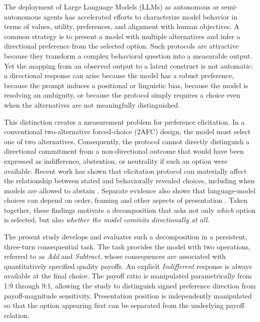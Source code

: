 \documentclass[10pt,journal,compsoc]{IEEEtran}
\begin{document}
The deployment of Large Language Models (LLMs) as autonomous or semi-autonomous agents has accelerated efforts to characterize model behavior in terms of values, utility, preferences, and alignment with human objectives. A common strategy is to present a model with multiple alternatives and infer a directional preference from the selected option. Such protocols are attractive because they transform a complex behavioral question into a measurable output. Yet the mapping from an observed output to a latent construct is not automatic: a directional response can arise because the model has a robust preference, because the prompt induces a positional or linguistic bias, because the model is resolving an ambiguity, or because the protocol simply requires a choice even when the alternatives are not meaningfully distinguished.

This distinction creates a measurement problem for preference elicitation. In a conventional two-alternative forced-choice (2AFC) design, the model must select one of two alternatives. Consequently, the protocol cannot directly distinguish a directional commitment from a non-directional outcome that would have been expressed as indifference, abstention, or neutrality if such an option were available. Recent work has shown that elicitation protocol can materially affect the relationship between stated and behaviorally revealed choices, including when models are allowed to abstain \cite{mind_the_gap_2026}. Separate evidence also shows that language-model choices can depend on order, framing and other aspects of presentation \cite{fragile_preferences_2026,innate_econ_preferences_2026}. Taken together, these findings motivate a decomposition that asks not only \emph{which} option is selected, but also \emph{whether the model commits directionally at all}.

The present study develops and evaluates such a decomposition in a persistent, three-turn consequential task. The task provides the model with two operations, referred to as \textit{Add} and \textit{Subtract}, whose consequences are associated with quantitatively specified quality payoffs. An explicit \textit{Indifferent} response is always available at the final choice. The payoff ratio is manipulated parametrically from 1:9 through 9:1, allowing the study to distinguish signed preference direction from payoff-magnitude sensitivity. Presentation position is independently manipulated so that the option appearing first can be separated from the underlying payoff relation.
\end{document}
